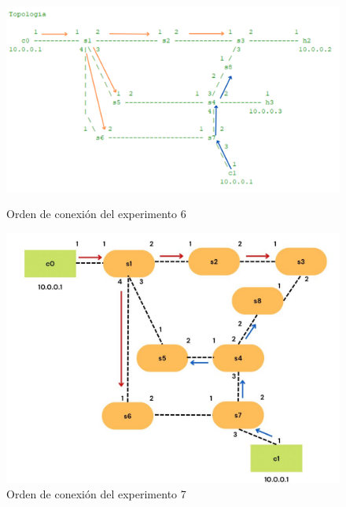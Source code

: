 \documentclass[a4paper, 12pt]{book}
\begin{document}
\begin{figure}[H]
 		\begin{minipage}[b]{0.35\textwidth}
 			\centering
 			\includegraphics[width=\textwidth]{img/escenario1_2c_5}
 			\caption{Orden de conexión del experimento 6}
 		\end{minipage}
 		\hfill
 		\begin{minipage}[b]{0.35\textwidth}
 			\centering
 			\includegraphics[width=\textwidth]{img/escenario1_2c_6}
 			\caption{Orden de conexión del experimento 7}
 		\end{minipage}
 		
 		\vspace{10pt} %
 		

\end{figure}
\end{document}
